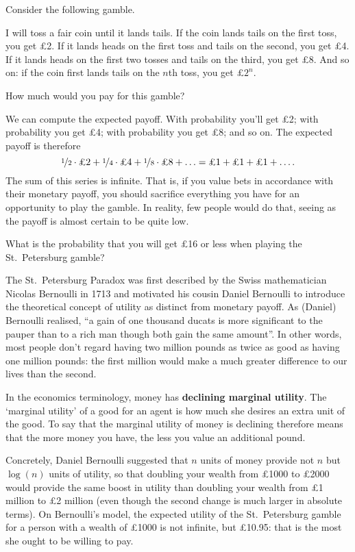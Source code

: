 Consider the following gamble.
\begin{example}
  I will toss a fair coin until it lands tails. If the coin lands tails on
  the first toss, you get £2. If it lands heads on the first
  toss and tails on the second, you get £4. If it lands heads on the
  first two tosses and tails on the third, you get £8. And so on: if
  the coin first lands tails on the $n$th toss, you get £$2^n$.
\end{example}
How much would you pay for this gamble? 

We can compute the expected payoff. With probability 
you'll get £2; with probability  you get £4; with
probability  you get £8; and so on. The expected payoff
is therefore
\[
  \nicefrac{1}{2} \cdot \text{£2} + 
  \nicefrac{1}{4} \cdot \text{£4} + 
  \nicefrac{1}{8} \cdot \text{£8} + 
  \ldots = \text{£1} +  \text{£1} +  \text{£1} + \ldots. 
\]
The sum of this series is infinite. That is, if you value bets in
accordance with their monetary payoff, you should sacrifice everything
you have for an opportunity to play the gamble. In reality, few
people would do that, seeing as the payoff is almost certain to be
quite low.

\begin{exercise}
  What is the probability that you will get £16 or less when playing
  the St.\ Petersburg gamble?
\end{exercise}

The St.\ Petersburg Paradox was first described by the Swiss
mathematician Nicolas Bernoulli in 1713 and motivated his cousin
Daniel Bernoulli to introduce the theoretical concept of utility as
distinct from monetary payoff. As (Daniel) Bernoulli realised, ``a
gain of one thousand ducats is more significant to the pauper than to
a rich man though both gain the same amount''. In other words, most
people don't regard having two million pounds as twice as good as
having one million pounds: the first million would make a much greater
difference to our lives than the second.

In the economics terminology, money has \textbf{declining marginal
  utility}. The `marginal utility' of a good for an agent is how much
she desires an extra unit of the good. To say that the marginal
utility of money is declining therefore means that the more money you
have, the less you value an additional pound.

Concretely, Daniel Bernoulli suggested that $n$ units of money provide
not $n$ but $\log(n)$ units of utility, so that doubling your wealth
from £1000 to £2000 would provide the same boost in utility than
doubling your wealth from £1 million to £2 million (even though the
second change is much larger in absolute terms). On Bernoulli's model,
the expected utility of the St.\ Petersburg gamble for a person with a
wealth of £1000 is not infinite, but £10.95: that is the most she
ought to be willing to pay.

